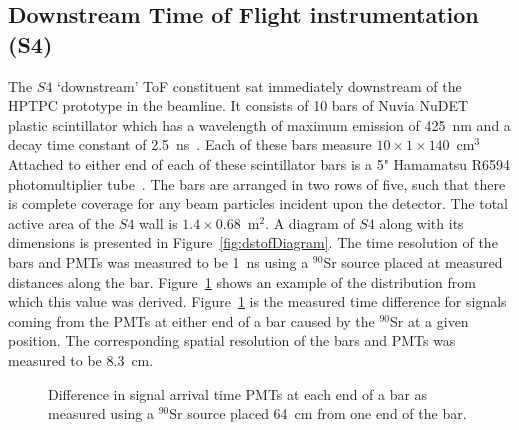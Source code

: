 \subsection{Downstream Time of Flight instrumentation (S4)}
\label{subsec:s4Exp}
The $\mathit{S4}$ `downstream' ToF constituent sat immediately downstream of the HPTPC prototype in the beamline. 
It consists of 10 bars of Nuvia NuDET plastic scintillator which has a wavelength of maximum emission of 425~nm and a decay time constant of 2.5~ns~\cite{Nuvia}.
Each of these bars measure $10 \times 1 \times 140$~cm$^3$
Attached to either end of each of these scintillator bars is a 5" Hamamatsu R6594 photomultiplier tube~\cite{Hamamatsu}.
The bars are arranged in two rows of five, such that there is complete coverage for any beam particles incident upon the detector.
The total active area of the $\mathit{S4}$ wall is $1.4 \times 0.68$~m$^2$.
A diagram of $\mathit{S4}$ along with its dimensions is presented in Figure~\ref{fig:dstofDiagram}.
The time resolution of the bars and PMTs was measured to be 1~ns using a $^{90}$Sr source placed at measured distances along the bar.
Figure~\ref{fig:s4Res} shows an example of the distribution from which this value was derived.
Figure~\ref{fig:s4Res} is the measured time difference for signals coming from the PMTs at either end of a bar caused by the $^{90}$Sr at a given position.
The corresponding spatial resolution of the bars and PMTs was measured to be 8.3~cm.

\begin{figure}[h]
	\begin{adjustbox}{max totalsize={.7\textwidth}{.5\textheight},center}
		
	\end{adjustbox}
	\caption{Difference in signal arrival time PMTs at each end of a bar as measured using a $^{90}$Sr source placed 64~cm from one end of the bar.}
	\label{fig:s4Res}	
\end{figure}

